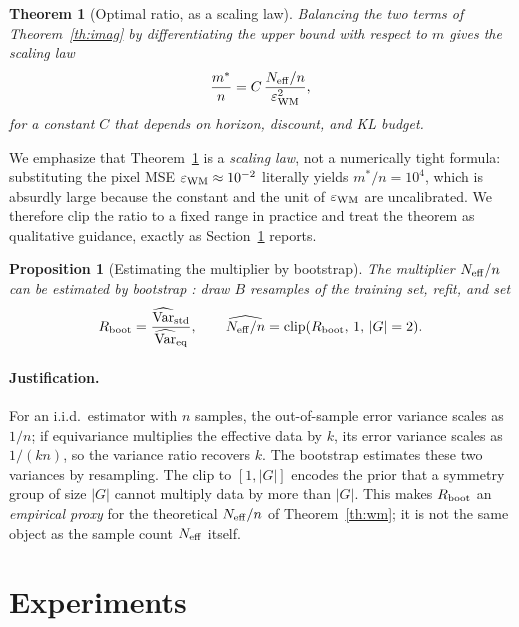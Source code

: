 \documentclass[preprint,12pt]{elsarticle}
\newtheorem{theorem}{Theorem}
\newtheorem{proposition}{Proposition}
\begin{document}
\begin{theorem}[Optimal ratio, as a scaling law]\label{th:ratio}
Balancing the two terms of Theorem~\ref{th:imag} by differentiating the upper
bound with respect to $m$ gives the scaling law
\begin{equation}
  \frac{m^*}{n}=C\,\frac{N_{\rm eff}/n}{\varepsilon_{\rm WM}^{2}},
\end{equation}
for a constant $C$ that depends on horizon, discount, and KL budget.
\end{theorem}

We emphasize that Theorem~\ref{th:ratio} is a \emph{scaling law}, not a
numerically tight formula: substituting the pixel MSE
$\varepsilon_{\rm WM}\approx10^{-2}$ literally yields $m^*/n=10^4$, which is
absurdly large because the constant and the unit of $\varepsilon_{\rm WM}$
are uncalibrated. We therefore clip the ratio to a fixed range in practice
and treat the theorem as qualitative guidance, exactly as
Section~\ref{sec:exp} reports.

\begin{proposition}[Estimating the multiplier by bootstrap]\label{prop:meff}
The multiplier $N_{\rm eff}/n$ can be estimated by bootstrap
\cite{bootstrap1993}: draw $B$ resamples of the training set, refit, and set
\begin{equation}
  R_{\rm boot}=\frac{\widehat{\operatorname{Var}}_{\rm std}}{\widehat{\operatorname{Var}}_{\rm eq}},
  \qquad
  \widehat{N_{\rm eff}/n}=\operatorname{clip}(R_{\rm boot},\,1,\,|G|=2).
\end{equation}
\end{proposition}

\paragraph{Justification.}
For an i.i.d.\ estimator with $n$ samples, the out-of-sample error variance
scales as $1/n$; if equivariance multiplies the effective data by $k$, its
error variance scales as $1/(kn)$, so the variance ratio recovers $k$. The
bootstrap \cite{bootstrap1993} estimates these two variances by resampling.
The clip to $[1,|G|]$ encodes the prior that a symmetry group of size $|G|$
cannot multiply data by more than $|G|$. This makes $R_{\rm boot}$ an
\emph{empirical proxy} for the theoretical $N_{\rm eff}/n$ of
Theorem~\ref{th:wm}; it is not the same object as the sample count $N_{\rm eff}$ itself.

\section{Experiments}\label{sec:exp}
\end{document}
